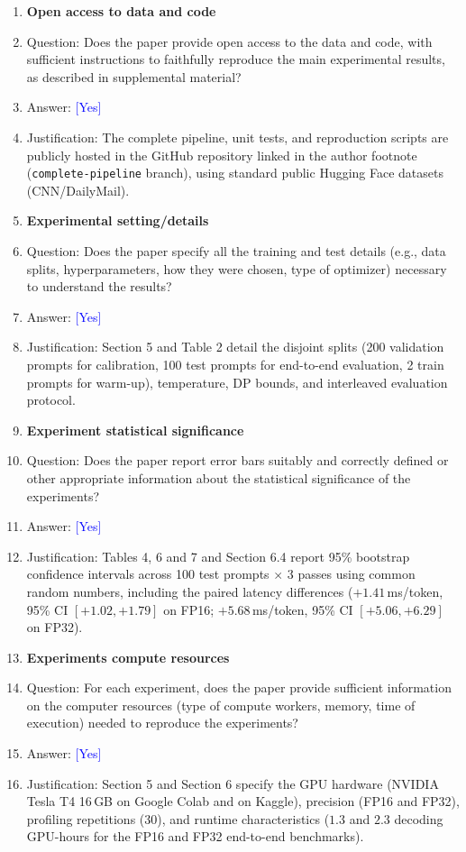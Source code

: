 \documentclass[10pt]{article}
\newcommand{\answerYes}[1][]{\textcolor{blue}{[Yes]} #1}
\begin{document}
\begin{enumerate}
\item {\bf Open access to data and code}
    \item[] Question: Does the paper provide open access to the data and code, with sufficient instructions to faithfully reproduce the main experimental results, as described in supplemental material?
    \item[] Answer: \answerYes{}
    \item[] Justification: The complete pipeline, unit tests, and reproduction scripts are publicly hosted in the GitHub repository linked in the author footnote (\texttt{complete-pipeline} branch), using standard public Hugging Face datasets (CNN/DailyMail).

\item {\bf Experimental setting/details}
    \item[] Question: Does the paper specify all the training and test details (e.g., data splits, hyperparameters, how they were chosen, type of optimizer) necessary to understand the results?
    \item[] Answer: \answerYes{}
    \item[] Justification: Section 5 and Table 2 detail the disjoint splits (200 validation prompts for calibration, 100 test prompts for end-to-end evaluation, 2 train prompts for warm-up), temperature, DP bounds, and interleaved evaluation protocol.

\item {\bf Experiment statistical significance}
    \item[] Question: Does the paper report error bars suitably and correctly defined or other appropriate information about the statistical significance of the experiments?
    \item[] Answer: \answerYes{}
    \item[] Justification: Tables 4, 6 and 7 and Section 6.4 report 95\% bootstrap confidence intervals across 100 test prompts $\times$ 3 passes using common random numbers, including the paired latency differences ($+1.41$\,ms/token, 95\% CI $[+1.02, +1.79]$ on FP16; $+5.68$\,ms/token, 95\% CI $[+5.06, +6.29]$ on FP32).

\item {\bf Experiments compute resources}
    \item[] Question: For each experiment, does the paper provide sufficient information on the computer resources (type of compute workers, memory, time of execution) needed to reproduce the experiments?
    \item[] Answer: \answerYes{}
    \item[] Justification: Section 5 and Section 6 specify the GPU hardware (NVIDIA Tesla T4 16\,GB on Google Colab and on Kaggle), precision (FP16 and FP32), profiling repetitions (30), and runtime characteristics ($1.3$ and $2.3$ decoding GPU-hours for the FP16 and FP32 end-to-end benchmarks).


\end{enumerate}
\end{document}
